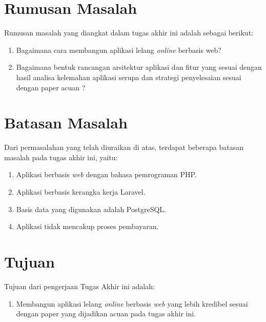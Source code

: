   \section{Rumusan Masalah}
    Rumusan masalah yang diangkat dalam tugas akhir ini adalah sebagai berikut: 
    \begin{enumerate}
      \item Bagaimana cara membangun aplikasi lelang \textit{online} berbasis web?
      \item Bagaimana bentuk rancangan arsitektur aplikasi dan fitur yang sesuai dengan hasil analisa kelemahan aplikasi serupa dan strategi penyelesaian sesuai dengan paper acuan \cite{ying-feng_kuo_online_2016}?
    \end{enumerate}

  \section{Batasan Masalah}
  	\label{batasan-masalah}
    Dari permasalahan yang telah diuraikan di atas, terdapat beberapa batasan masalah pada tugas akhir ini, yaitu:
    \begin{enumerate}
      \item Aplikasi berbasis \textit{web} dengan bahasa pemrograman PHP.
      \item Aplikasi berbasis kerangka kerja Laravel.
      \item Basis data yang digunakan adalah PostgreSQL.
      \item Aplikasi tidak mencakup proses pembayaran.
    \end{enumerate}

  \section{Tujuan}
  \label{tujuan}
    Tujuan dari pengerjaan Tugas Akhir ini adalah: 
    \begin{enumerate}
      \item Membangun aplikasi lelang \textit{online} berbasis \textit{web} yang lebih kredibel sesuai dengan paper yang dijadikan acuan pada tugas akhir ini. 
    \end{enumerate}
    
    
